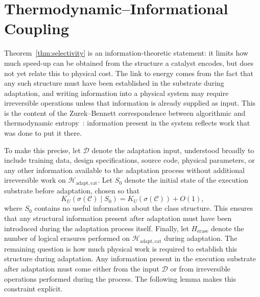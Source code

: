 \documentclass[runningheads]{llncs}
\newcommand{\Hw}{\mathcal{H}}
\newcommand{\Class}{\mathcal{C}}
\newcommand{\Herase}{H_{\mathrm{erase}}}
\begin{document}
\section{Thermodynamic--Informational Coupling}
\label{sec:coupling}

Theorem~\ref{thm:selectivity} is an information-theoretic statement:
it limits how much speed-up can be obtained from the structure a
catalyst encodes, but does not yet relate this to physical cost.
The link to energy comes from the fact that any such structure must
have been established in the substrate during adaptation, and
writing information into a physical system may require irreversible
operations unless that information is already supplied as input.
This is the content of the Zurek--Bennett correspondence between
algorithmic and thermodynamic entropy~\cite{zurek1989algorithmic,bennett1982thermodynamics,bennett1998information}: information
present in the system reflects work that was done to put it there.

To make this precise, let $\mathcal{D}$ denote the adaptation input,
understood broadly to include training data, design specifications,
source code, physical parameters, or any other information available
to the adaptation process without additional irreversible work on
$\Hw_{\mathrm{adapt,cat}}$. Let $S_0$ denote the initial state of the
execution substrate before adaptation, chosen so that
\[
K_U(\sigma(\Class)\mid S_0)=K_U(\sigma(\Class))+O(1),
\]
where $S_0$ contains no useful information about the class
structure. This ensures that any structural information present
after adaptation must have been introduced during the adaptation
process itself. Finally, let $\Herase$ denote the number of logical
erasures performed on $\Hw_{\mathrm{adapt,cat}}$ during adaptation. The remaining question is how much physical work is required to
establish this structure during adaptation. Any information present
in the execution substrate after adaptation must come either from
the input $\mathcal{D}$ or from irreversible operations performed
during the process. The following lemma makes this constraint
explicit.
\end{document}
